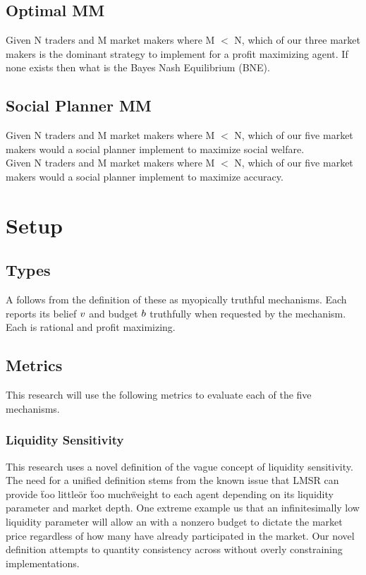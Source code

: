 \subsection{Optimal MM}
Given N traders and M market makers where M $<$ N, which of our three market makers is the
dominant strategy to implement for a profit maximizing agent. 
If none exists then what is the Bayes Nash Equilibrium (BNE).\\

\subsection{Social Planner MM}
Given N traders and M market makers where M $<$ N, which of our five market makers would
a social planner implement to maximize social welfare.\\

Given N traders and M market makers where M $<$ N, which of our five market makers would
a social planner implement to maximize accuracy.

\section{Setup}

\subsection{Types}
A  follows from the definition of these  as myopically truthful
mechanisms. Each  reports its belief $v$ and budget $b$
truthfully when requested by the mechanism. Each  is rational and profit
maximizing.

\subsection{Metrics}
This research will use the following metrics to evaluate each of the five mechanisms.
\subsubsection{Liquidity Sensitivity}
This research uses a novel definition of the vague concept of liquidity sensitivity. The need
for a unified definition stems from the known issue that LMSR can provide \"too little\" or 
\"too much\" weight to each agent depending on its liquidity parameter and market depth. One extreme
example us that an infinitesimally low liquidity parameter will allow an  with a nonzero
budget to dictate the market price regardless of how many  have already participated in
the market. Our novel definition attempts to quantity consistency across  without
overly constraining implementations. \\

